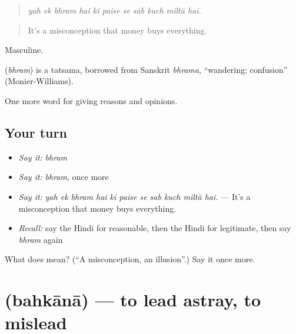 \begin{quote}
          
\end{quote}

\begin{quote}
\emph{yah ek bhram hai ki paise se sab kuch miltā hai.}
\end{quote}

\begin{quote}
It's a misconception that money buys everything.
\end{quote}

Masculine.

\begin{cousinweb}
\textbf{} (\emph{bhram}) is a tatsama, borrowed from Sanskrit \emph{bhrama}, \textquotedblleft{}wandering; confusion\textquotedblright{} (Monier-Williams).
\end{cousinweb}

\begin{grammarlens}[title={What you've built}]
One more word for giving reasons and opinions.
\end{grammarlens}

\subsection*{Your turn}
\begin{itemize}
\raggedright
  \item \emph{Say it:} \emph{bhram}
  \item \emph{Say it:} \emph{bhram}, once more
  \item \emph{Say it:} \emph{yah ek bhram hai ki paise se sab kuch miltā hai.} — It's a misconception that money buys everything.
  \item \emph{Recall:} say the Hindi for reasonable, then the Hindi for legitimate, then say \emph{bhram} again
\end{itemize}

\begin{tcolorbox}[breakable,colback=teal!4,colframe=teal!35!black,title={Before you move on}]
What does  mean? (\textquotedblleft{}A misconception, an illusion\textquotedblright{}.) Say it once more.
\end{tcolorbox}
\section[\texorpdfstring{\hi{बहकाना} (bahkānā)}{बहकाना (bahkānā)}]{ (bahkānā) — to lead astray, to mislead}


